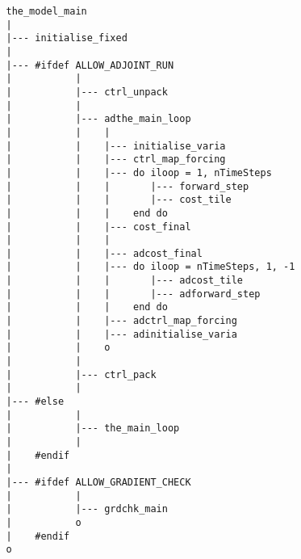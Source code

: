 \begin{figure}[b!]

{\scriptsize
\begin{verbatim}
   the_model_main
   |
   |--- initialise_fixed
   |
   |--- #ifdef ALLOW_ADJOINT_RUN
   |           |    
   |           |--- ctrl_unpack
   |           |    
   |           |--- adthe_main_loop
   |           |    |
   |           |    |--- initialise_varia
   |           |    |--- ctrl_map_forcing
   |           |    |--- do iloop = 1, nTimeSteps
   |           |    |       |--- forward_step
   |           |    |       |--- cost_tile
   |           |    |    end do
   |           |    |--- cost_final
   |           |    |
   |           |    |--- adcost_final
   |           |    |--- do iloop = nTimeSteps, 1, -1
   |           |    |       |--- adcost_tile
   |           |    |       |--- adforward_step
   |           |    |    end do
   |           |    |--- adctrl_map_forcing
   |           |    |--- adinitialise_varia
   |           |    o
   |           |
   |           |--- ctrl_pack
   |           |
   |--- #else
   |           |
   |           |--- the_main_loop
   |           |
   |    #endif
   |
   |--- #ifdef ALLOW_GRADIENT_CHECK
   |           |
   |           |--- grdchk_main
   |           o
   |    #endif
   o
\end{verbatim}
}
\caption{~}
\label{fig:adthemodel}
\end{figure}


